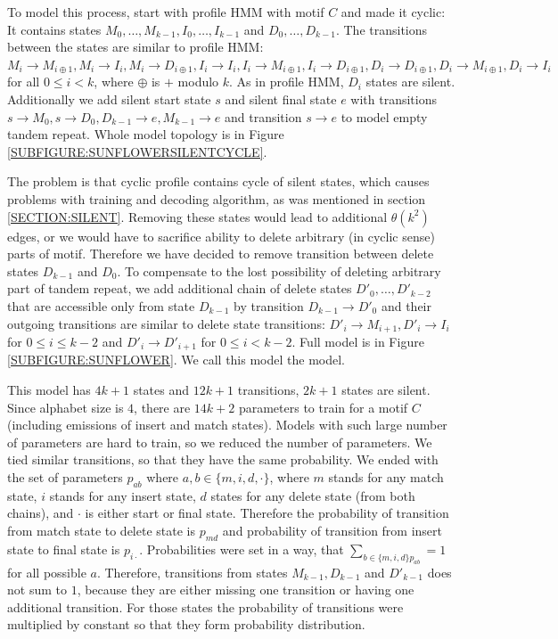 To model this process, start with profile HMM with motif $C$ and made it
cyclic: It contains states $M_0,\dots, M_{k-1}, I_{0}, \dots, I_{k-1}$ and
$D_{0}, \dots, D_{k-1}$. The transitions between the states are similar to
profile HMM:  $M_{i}\to M_{i\oplus 1}, M_i\to I_i, M_i\to D_{i\oplus 1}, I_i\to
I_i, I_i\to M_{i\oplus 1}, I_i\to D_{i\oplus 1}, D_{i}\to D_{i \oplus 1},
D_{i}\to M_{i\oplus 1}, D_{i}\to I_i$ for all $0\leq i < k$, where $\oplus$ is
$+$ modulo $k$. As in profile HMM, $D_i$ states are silent. Additionally we add
silent start state $s$ and silent final state $e$ with transitions $s\to M_0,
s\to D_0, D_{k-1}\to e, M_{k-1}\to e$ and transition $s\to e$ to model empty
tandem repeat.  Whole model topology is in Figure
\ref{SUBFIGURE:SUNFLOWERSILENTCYCLE}.

The problem is that cyclic profile contains cycle of silent states, which
causes problems with training and decoding algorithm, as was  mentioned in
section \ref{SECTION:SILENT}. Removing these states would lead to additional
$\theta(k^2)$ edges, or we would have to sacrifice ability to delete arbitrary
(in cyclic sense) parts of motif. Therefore we have decided to remove
transition between delete states $D_{k-1}$ and $D_0$. To compensate to the lost
possibility of deleting arbitrary part of tandem repeat, we add additional
chain of delete states $D'_0, \dots, D'_{k-2}$ that are accessible only from
state $D_{k-1}$ by transition $D_{k-1}\to D'_0$ and their outgoing transitions
are similar to delete state transitions: $D'_{i}\to M_{i+1}, D'_{i}\to I_i$ for
$0\leq i\leq k-2$ and $D'_{i} \to D'_{i+1}$ for $0\leq i < k-2$. Full model is
in Figure \ref{SUBFIGURE:SUNFLOWER}. We call this model the
 model.

This model has $4k+1$ states and $12k+1$ transitions, $2k+1$ states are silent.
Since alphabet size is $4$, there are $14k+2$ parameters to train for a
motif $C$ (including emissions of insert and match states). Models with
such large number of parameters are hard to train, so we reduced the number of
parameters. We tied similar transitions, so that they have the same probability.
We ended with the set of parameters $p_{ab}$ where $a,b\in \{m, i, d, \cdot\}$,
where $m$ stands for any match state, $i$ stands for any insert state, $d$ states for
any delete state (from both chains), and $\cdot$ is either start or final
state. Therefore the probability of transition from match state to delete state
is $p_{md}$ and probability of transition from insert state to final state is
$p_{i\cdot}$.  Probabilities were set in a way, that $\sum_{b\in\{m,i,d\}
p_{ab}}=1$ for all possible $a$.  Therefore, transitions from states $M_{k-1},
D_{k-1}$ and $D'_{k-1}$ does not sum to $1$, because they are either missing
one transition or having one additional transition. For those states the
probability of transitions were multiplied by constant so that they form
probability distribution. 

